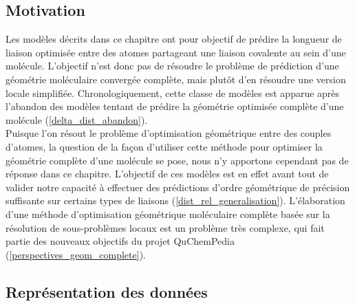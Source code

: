 \subsection{Motivation}

Les modèles décrits dans ce chapitre ont pour objectif de prédire la longueur de liaison optimisée entre des atomes partageant une liaison covalente au sein d'une molécule. L'objectif n'est donc pas de résoudre le problème de prédiction d'une géométrie moléculaire convergée complète, mais plutôt d'en résoudre une version locale simplifiée. Chronologiquement, cette classe de modèles est apparue après l'abandon des modèles tentant de prédire la géométrie optimisée complète d'une molécule (\ref{delta_dist_abandon}).\\
Puisque l'on résout le problème d'optimisation géométrique entre des couples d'atomes, la question de la façon d'utiliser cette méthode pour optimiser la géométrie complète d'une molécule se pose, nous n'y apportons cependant pas de réponse dans ce chapitre. L'objectif de ces modèles est en effet avant tout de valider notre capacité à effectuer des prédictions d'ordre géométrique de précision suffisante sur certains types de liaisons (\ref{dist_rel_generalisation}). L'élaboration d'une méthode d'optimisation géométrique moléculaire complète basée sur la résolution de sous-problèmes locaux est un problème très complexe, qui fait partie des nouveaux objectifs du projet QuChemPedia (\ref{perspectives_geom_complete}).\\

\subsection{Représentation des données}

\label{dist_rel_repr_donnees}

